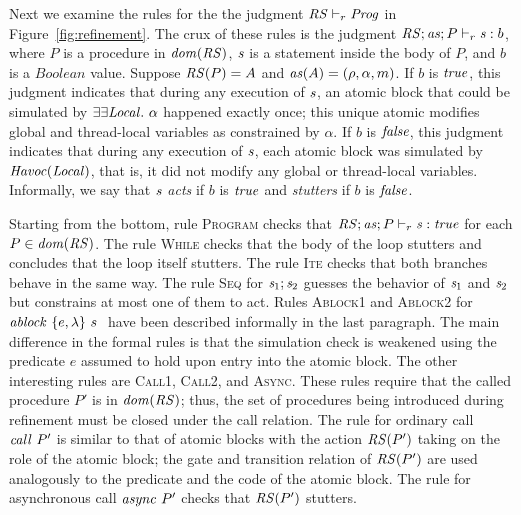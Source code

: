 Next we examine the rules for the the judgment $\mathit{RS} \vdash_r \mathit{Prog}$ in Figure~\ref{fig:refinement}.
The crux of these rules is the judgment $\mathit{RS};\mathit{as};P \vdash_r \mathit{s} : b$, 
where $P$ is a procedure in $\mathit{dom}(\mathit{RS})$, $\mathit{s}$ is a statement inside the body of $P$, and $b$ is a 
$\mathit{Boolean}$ value.
Suppose $\mathit{RS}(P) = A$ and $\mathit{as}(A) = (\rho, \alpha, m)$.
If $b$ is $\mathit{true}$, this judgment indicates that during any execution of $\mathit{s}$, 
an atomic block that could be simulated by $\exists\exists {\mathit{Local}}.\ \alpha$ happened exactly once;
this unique atomic modifies global and thread-local variables as constrained by $\alpha$.
If $b$ is $\mathit{false}$, this judgment indicates that during any execution of $\mathit{s}$, each atomic block
was simulated by $\mathit{Havoc}(\mathit{Local})$, that is, it did not modify any global or thread-local variables.
Informally, we say that $\mathit{s}$ {\em acts\/} if $b$ is $\mathit{true}$ and {\em stutters\/} if $b$ is $\mathit{false}$.

Starting from the bottom, rule \textsc{Program} checks that $\mathit{RS};\mathit{as};P \vdash_r \mathit{s} : \mathit{true}$
for each $P \in \mathit{dom}(\mathit{RS})$.
The rule \textsc{While} checks that the body of the loop stutters and concludes that the loop itself stutters.
The rule \textsc{Ite} checks that both branches behave in the same way.
The rule \textsc{Seq} for $\mathit{s}_1;\mathit{s}_2$ guesses the behavior of $\mathit{s}_1$ and $\mathit{s}_2$ but constrains
at most one of them to act.
Rules \textsc{Ablock1} and \textsc{Ablock2} for $\mathit{ablock}\ {\{e,\lambda\}}\ {s}\ $ have been described informally in the last paragraph.  
The main difference in the formal rules is that the simulation check is weakened using the predicate $e$
assumed to hold upon entry into the atomic block.
The other interesting rules are \textsc{Call1}, \textsc{Call2}, and \textsc{Async}.
These rules require that the called procedure $P'$ is in $\mathit{dom}(\mathit{RS})$;
thus, the set of procedures being introduced during refinement must be closed under the call relation.
The rule for ordinary call $\mathit{call}\ P'$ is similar to that of atomic blocks with the action $\mathit{RS}(P')$
taking on the role of the atomic block;
the gate and transition relation of $\mathit{RS}(P')$ are used analogously to the predicate and the code of the atomic block.
The rule for asynchronous call $\mathit{async}\ P'$ checks that $\mathit{RS}(P')$ stutters.

